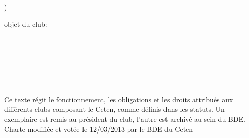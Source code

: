 \documentclass{article} %
\begin{document}
\begin{titlepage}
\begin{todolist}
			\underline{\hspace{5cm}})
		\end{todolist}
		\vspace{\baselineskip}
		objet du club:\\
		\hspace{\textwidth}\\
		\underline{\hspace{\textwidth}}\\
		\hspace{\textwidth}\\
		\underline{\hspace{\textwidth}}\\
		\hspace{\textwidth}\\
		\underline{\hspace{\textwidth}}\\

		\vfill
		\begin{center}
			{\footnotesize \light{} Ce texte régit le fonctionnement, les obligations et les
			droits attribués aux différents clubs composant le Ceten, comme
			définis dans les statuts. Un exemplaire est remis au président du
			club, l’autre est archivé au sein du BDE\@. \\
			Charte modifiée et votée le 12/03/2013 par le BDE du Ceten}
		\end{center}
	\end{titlepage}


\end{document}
